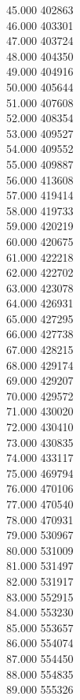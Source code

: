 { 45.000	402863 \\
 46.000	403301 \\
 47.000	403724 \\
 48.000	404350 \\
 49.000	404916 \\
 50.000	405644 \\
 51.000	407608 \\
 52.000	408354 \\
 53.000	409527 \\
 54.000	409552 \\
 55.000	409887 \\
 56.000	413608 \\
 57.000	419414 \\
 58.000	419733 \\
 59.000	420219 \\
 60.000	420675 \\
 61.000	422218 \\
 62.000	422702 \\
 63.000	423078 \\
 64.000	426931 \\
 65.000	427295 \\
 66.000	427738 \\
 67.000	428215 \\
 68.000	429174 \\
 69.000	429207 \\
 70.000	429572 \\
 71.000	430020 \\
 72.000	430410 \\
 73.000	430835 \\
 74.000	433117 \\
 75.000	469794 \\
 76.000	470106 \\
 77.000	470540 \\
 78.000	470931 \\
 79.000	530967 \\
 80.000	531009 \\
 81.000	531497 \\
 82.000	531917 \\
 83.000	552915 \\
 84.000	553230 \\
 85.000	553657 \\
 86.000	554074 \\
 87.000	554450 \\
 88.000	554835 \\
 89.000	555326 \\
}
